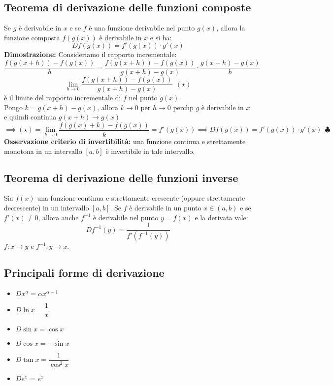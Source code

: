 \documentclass[../../main.tex]{subfiles}
\begin{document}
\subsection{Teorema di derivazione delle funzioni composte}
Se $g$ è derivabile in $x$ e se $f$ è una funzione derivabile nel punto $g(x)$, allora la funzione composta $f(g(x))$ è derivabile
in $x$ e si ha:
\[
    D f(g(x)) = f'(g(x)) \cdot g'(x)
\]
\textbf{Dimostrazione:} Consideriamo il rapporto incrementale:
\[
    \dfrac{f(g(x+h)) - f(g(x))}{h} = \dfrac{f(g(x+h)) - f(g(x))}{g(x+h) - g(x)} \cdot \dfrac{g(x+h) - g(x)}{h}
\]
\[
    \lim_{h\to 0} \dfrac{f(g(x+h)) - f(g(x))}{g(x+h) - g(x)} \ \ (\star)
\]
è il limite del rapporto incrementale di $f$ nel punto $g(x)$.\\
Pongo $k = g(x+h) - g(x)$, allora $k\to 0$ per $h\to 0$ perchp $g$ è derivabile in $x$ e quindi continua $g(x+h)\to g(x)$\\
\[
    \implies (\star) = \lim_{k\to 0} \dfrac{f(g(x) + k) - f(g(x))}{k} = f'(g(x)) \implies D f(g(x)) = f'(g(x)) \cdot g'(x) \ \ \clubsuit
\]
\textbf{Osservazione criterio di invertibilità:} una funzione continua e strettamente monotona in un intervallo $[a, b]$ è invertibile in tale intervallo.

\subsection{Teorema di derivazione delle funzioni inverse}
Sia $f(x)$ una funzione continua e strettamente crescente (oppure strettamente decrescente) in un intervallo $[a, b]$. Se $f$ è derivabile in un
punto $x\in (a,b)$ e se $f'(x) \neq 0$, allora anche $f^{-1}$ è derivabile nel punto $y = f(x)$ e la derivata vale:
\[
    D f^{-1}(y) = \dfrac{1}{f'(f^{-1}(y))}
\]
$f: x\to y$ e $f^{-1}: y\to x$.\\

\subsection{Principali forme di derivazione}
\begin{itemize}
    \item $Dx^{\alpha} = \alpha x^{\alpha - 1}$
    \item $D\ln x = \dfrac{1}{x}$
    \item $D\sin x = \cos x$
    \item $D\cos x = -\sin x$
    \item $D\tan x = \dfrac{1}{\cos^2 x}$
    \item $D e^x$ = $e^x$
\end{itemize}
\end{document}
